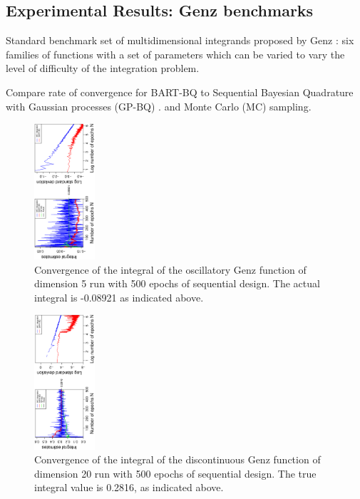 \documentclass[a0,portrait]{a0poster}
\begin{document}
\begin{multicols}{3}

\section*{Experimental Results: Genz benchmarks}

Standard benchmark set of multidimensional integrands proposed by Genz \cite{Genz}:
six families of functions with a set of parameters which can be varied to vary the level of difficulty of the integration problem. 

Compare rate of convergence for BART-BQ to Sequential Bayesian Quadrature with Gaussian processes (GP-BQ) \cite{ohagan1991bayes}.
and Monte Carlo (MC) sampling.

\begin{figure}[H]
\centering
\vspace*{-1.5in}
\includegraphics[width = 0.2\textwidth, angle = -90]{report/Figures/5/convergenceMean55Dimensions.eps}
\vspace*{-1in}
\caption{Convergence of the integral of the oscillatory Genz function of dimension 5 run with 500 epochs of sequential design. The actual integral is -0.08921 as indicated above.}
\label{fig:genz3}
\vspace*{-1mm}
\end{figure}
\begin{figure}[H]
\centering
\vspace*{-1.5in}
    \includegraphics[width = 0.2\textwidth, angle = -90]{report/Figures/3/convergenceMean320Dimensions.eps}
    \vspace*{-1in}
    \caption{Convergence of the integral of the discontinuous Genz function of dimension 20 run with 500 epochs of sequential design. The true integral value is 0.2816, as indicated above.}
\label{fig:genz3}
\vspace*{-1mm}
\end{figure}


\end{multicols}
\end{document}
